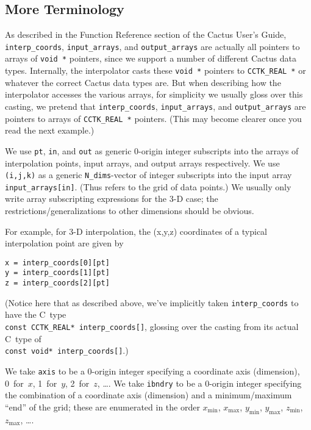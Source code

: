 
\subsection{More Terminology}

As described in the Function Reference section of the Cactus User's Guide,
\verb|interp_coords|, \verb|input_arrays|, and \verb|output_arrays| are
actually all pointers to arrays of \verb|void *| pointers, since we
support a number of different Cactus data types.  Internally, the
interpolator casts these \verb|void *| pointers to \verb|CCTK_REAL *|
or whatever the correct Cactus data types are.  But when describing
how the interpolator accesses the various arrays, for simplicity we
usually gloss over this casting, \ie{} we pretend that \verb|interp_coords|,
\verb|input_arrays|, and \verb|output_arrays| are pointers to arrays
of \verb|CCTK_REAL *| pointers.  (This may become clearer once you
read the next example.)

We use \verb|pt|, \verb|in|, and \verb|out| as generic 0-origin integer
subscripts into the arrays of interpolation points, input arrays, and
output arrays respectively.  We use \verb|(i,j,k)| as a generic
\verb|N_dims|-vector of integer subscripts into the input array
\verb|input_arrays[in]|.  (Thus  refers to
the grid of data points.)  We usually only write array subscripting
expressions for the 3-D case; the restrictions/generalizations to
other dimensions should be obvious.

For example, for 3-D interpolation, the (x,y,z) coordinates of a typical
interpolation point are given by
\begin{verbatim}
x = interp_coords[0][pt]
y = interp_coords[1][pt]
z = interp_coords[2][pt]
\end{verbatim}
(Notice here that as described above, we've implicitly taken
\verb|interp_coords| to have the C~type\\
\verb|const CCTK_REAL* interp_coords[]|, glossing over the casting
from its actual C~type of\\
\verb|const void* interp_coords[]|.)

We take \verb|axis| to be a 0-origin integer specifying a coordinate
axis (dimension), \ie{} 0~for~$x$, 1~for~$y$, 2~for~$z$, \dots.
We take \verb|ibndry| to be a 0-origin integer specifying the
combination of a coordinate axis (dimension) and a minimum/maximum
``end'' of the grid; these are enumerated in the order
$x_{\min}$, $x_{\max}$, $y_{\min}$, $y_{\max}$, $z_{\min}$,
$z_{\max}$, \dots.

